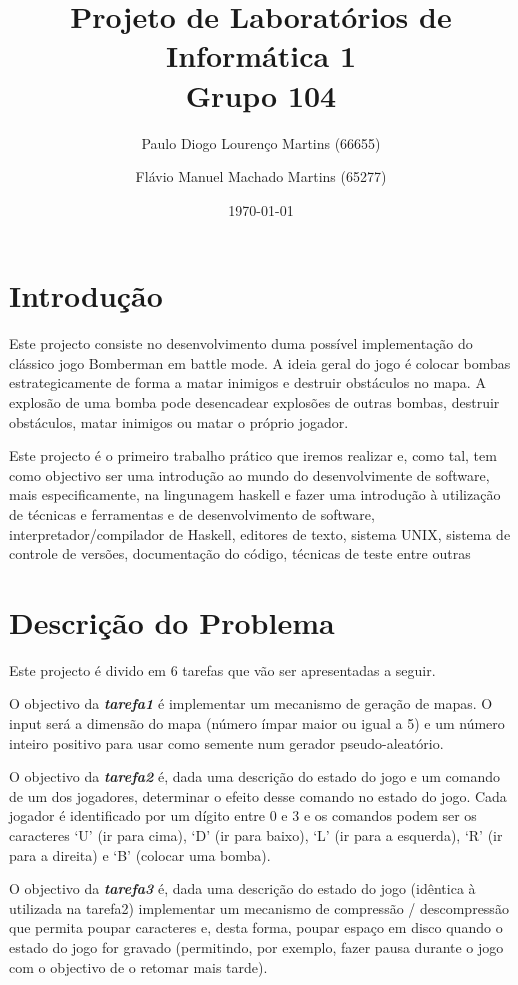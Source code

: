 \documentclass[a4paper]{article}
\title{Projeto de Laboratórios de Informática 1\\Grupo 104}
\author{Paulo Diogo Lourenço Martins (66655) \and Flávio Manuel Machado Martins (65277)}
\date{\today}
\begin{document}
\maketitle

\pagebreak
\tableofcontents

\pagebreak
\section{Introdução}
\label{sec:intro}

Este projecto consiste no desenvolvimento duma possível implementação do clássico jogo Bomberman em battle mode. A
ideia geral do jogo é colocar bombas estrategicamente de forma a matar inimigos e destruir
obstáculos no mapa. A explosão de uma bomba pode desencadear explosões de outras
bombas, destruir obstáculos, matar inimigos ou matar o próprio jogador.

Este projecto é o primeiro trabalho prático que iremos realizar e, como tal, tem como objectivo ser uma introdução ao mundo do desenvolvimente de software,
mais especificamente, na lingunagem haskell e fazer uma introdução à utilização de técnicas e ferramentas e de desenvolvimento de software, interpretador/compilador de Haskell, 
editores de texto, sistema UNIX, sistema de controle de versões, documentação do código, técnicas de teste entre outras


\pagebreak
\section{Descrição do Problema}
\label{sec:problema}

Este projecto é divido em 6 tarefas que vão ser apresentadas a seguir.

O objectivo da \textbf{\emph{tarefa1}} é implementar um mecanismo de geração de mapas.
O input será a dimensão do mapa (número ímpar maior ou igual a 5) e um número inteiro positivo para usar como semente num gerador pseudo-aleatório. 

O objectivo da \textbf{\emph{tarefa2}} é, dada uma descrição do estado do jogo e um comando de um dos
jogadores, determinar o efeito desse comando no estado do jogo. Cada jogador é identificado
por um dígito entre 0 e 3 e os comandos podem ser os caracteres ‘U’ (ir para cima), ‘D’ (ir
para baixo), ‘L’ (ir para a esquerda), ‘R’ (ir para a direita) e ‘B’ (colocar uma bomba).

O objectivo da \textbf{\emph{tarefa3}} é, dada uma descrição do estado do jogo (idêntica à utilizada na tarefa2)
 implementar um mecanismo de compressão / descompressão que permita poupar
caracteres e, desta forma, poupar espaço em disco quando o estado do jogo for gravado
(permitindo, por exemplo, fazer pausa durante o jogo com o objectivo de o retomar mais tarde).
\end{document}
